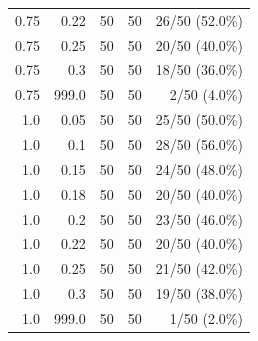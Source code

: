 \begin{small}
\begin{longtable}{@{}rrrrr@{}}
0.75 & 0.22 & 50 & 50 & 26/50 (52.0\%) \\
0.75 & 0.25 & 50 & 50 & 20/50 (40.0\%) \\
0.75 & 0.3 & 50 & 50 & 18/50 (36.0\%) \\
0.75 & 999.0 & 50 & 50 & 2/50 (4.0\%) \\
1.0 & 0.05 & 50 & 50 & 25/50 (50.0\%) \\
1.0 & 0.1 & 50 & 50 & 28/50 (56.0\%) \\
1.0 & 0.15 & 50 & 50 & 24/50 (48.0\%) \\
1.0 & 0.18 & 50 & 50 & 20/50 (40.0\%) \\
1.0 & 0.2 & 50 & 50 & 23/50 (46.0\%) \\
1.0 & 0.22 & 50 & 50 & 20/50 (40.0\%) \\
1.0 & 0.25 & 50 & 50 & 21/50 (42.0\%) \\
1.0 & 0.3 & 50 & 50 & 19/50 (38.0\%) \\
1.0 & 999.0 & 50 & 50 & 1/50 (2.0\%) \\
\end{longtable}
\end{small}


